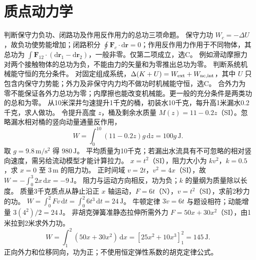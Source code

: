 \section{质点动力学}
\problemtext 判断保守力负功、闭路功及作用反作用力的总功三项命题。
\workings 保守力功 $W_c=-\Delta U$，故负功使势能增加；闭路积分 $\oint\bm F_c\cdot\mathrm d\bm r=0$；作用反作用力作用于不同物体，其总功为 $\int\bm F_{12}\cdot(\mathrm d\bm r_1-\mathrm d\bm r_2)$，一般非零。仅第二项成立，选C。
\crosscheck 例如滑动摩擦力对两个接触物体的总功为负，不能由力的矢量和为零推出总功为零。
\problemtext 判断系统机械能守恒的充分条件。
\workings 对固定组成系统，$\Delta(K+U)=W_{\rm ext}+W_{\rm nc,int}$，其中 $U$ 只包含内保守力势能；外力及非保守内力均不做功时机械能守恒，选C。
\crosscheck 合外力为零不能保证各外力总功为零；内摩擦也能改变机械能。更一般的充分条件是两类功的总和为零。
\problemtext 从10米深井匀速提升1千克的桶，初装水10千克，每升高1米漏水0.2千克，求人做功。
\workings 令提升高度 $z$，桶及剩余水质量 $M(z)=11-0.2z$（SI）。忽略漏水相对桶的竖向动量通量反作用，
\[
W=\int_0^{10}(11-0.2z)g\,\mathrm dz=100g\,\mathrm J.
\]
取 $g=9.8\,\mathrm{m/s^2}$ 得 $980\,\mathrm J$。
\crosscheck 平均质量为10千克；若漏出水流具有不可忽略的相对竖向速度，需另给流动模型才能计算拉力。
\problemtext $x=t^2$（SI），阻力大小为 $kv^2$，$k=0.5$，求 $x=0$ 至 $3\,\mathrm m$ 的阻力功。
\workings 正时间域 $v=2t$，$v^2=4x$（SI），故 $W=-\int_0^3 2x\,\mathrm dx=-9\,\mathrm J$。
\crosscheck 阻力与运动方向相反，功为负；$k$ 的量纲为质量除以长度。
\problemtext 质量3千克质点从静止沿正 $x$ 轴运动，$F=6t$（N），$v=t^2$（SI），求前2秒力的功。
\workings $W=\int_0^2Fv\,\mathrm dt=\int_0^2 6t^3\,\mathrm dt=24\,\mathrm J$。
\crosscheck 牛顿定律 $3\dot v=6t$ 与题设相符；动能增量 $3(4^2)/2=24\,\mathrm J$。
\problemtext 非胡克弹簧准静态拉伸所需外力 $F=50x+30x^2$（SI），由1米拉到2米求外力功。
\workings
\[
W=\int_1^2(50x+30x^2)\,\mathrm dx
=[25x^2+10x^3]_1^2=145\,\mathrm J.
\]
\crosscheck 正向外力和位移同向，功为正；不使用恒定弹性系数的胡克定律公式。
